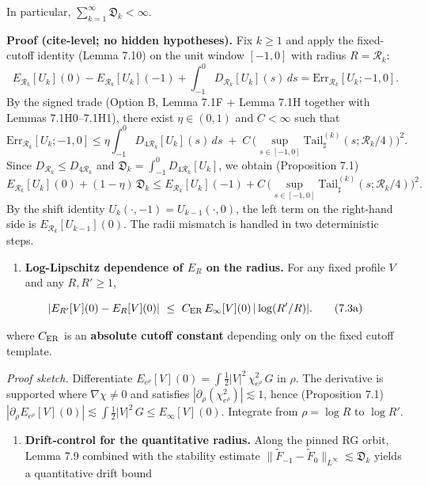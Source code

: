 \documentclass[
  11pt,
]{article}
\providecommand{\tightlist}{%
  \setlength{\itemsep}{0pt}\setlength{\parskip}{0pt}}
\begin{document}
In particular, \(\sum_{k=1}^{\infty}\mathfrak D_k<\infty\).

\textbf{Proof (cite-level; no hidden hypotheses).} Fix \(k\ge1\) and apply the fixed-cutoff identity (Lemma 7.10) on the unit window \([-1,0]\) with radius \(R=\mathcal R_k\): \[
E_{\mathcal R_k}[U_k](0)-E_{\mathcal R_k}[U_k](-1)+\int_{-1}^{0}D_{\mathcal R_k}[U_k](s)\,ds
=\mathrm{Err}_{\mathcal R_k}[U_k;-1,0].
\] By the signed trade (Option B, Lemma 7.1F + Lemma 7.1H together with Lemmas 7.1H0--7.1H1), there exist \(\eta\in(0,1)\) and \(C<\infty\) such that \[
\mathrm{Err}_{\mathcal R_k}[U_k;-1,0]
\le \eta\int_{-1}^{0}D_{4\mathcal R_k}[U_k](s)\,ds
\; +\; C\,\Big(\sup_{s\in[-1,0]}\mathrm{Tail}_\sharp^{(k)}(s;\mathcal R_k/4)\Big)^2.
\] Since \(D_{\mathcal R_k}\le D_{4\mathcal R_k}\) and \(\mathfrak D_k=\int_{-1}^{0}D_{4\mathcal R_k}[U_k]\), we obtain (Proposition 7.1) \[
E_{\mathcal R_k}[U_k](0) + (1-\eta)\,\mathfrak D_k
\le E_{\mathcal R_k}[U_k](-1) + C\,\Big(\sup_{s\in[-1,0]}\mathrm{Tail}_\sharp^{(k)}(s;\mathcal R_k/4)\Big)^2.
\] By the shift identity \(U_k(\cdot,-1)=U_{k-1}(\cdot,0)\), the left term on the right-hand side is \(E_{\mathcal R_k}[U_{k-1}](0)\). The radii mismatch is handled in two deterministic steps.

\begin{enumerate}
\def\labelenumi{\arabic{enumi}.}
\tightlist
\item
  \textbf{Log-Lipschitz dependence of \(E_R\) on the radius.} For any fixed profile \(V\) and any \(R,R'\ge 1\),
\end{enumerate}

\begin{equation}
 |E_{R'}[V](0)-E_R[V](0)|
 \ \le\
 C_{\rm ER}\,E_\infty[V](0)\,|\log(R'/R)|.
 \tag{7.3a}\label{eq:7_3a_log_lipschitz_ER}
\end{equation}

where \(C_{\rm ER}\) is an \textbf{absolute cutoff constant} depending only on the fixed cutoff template.

\emph{Proof sketch.} Differentiate \(E_{e^\rho}[V](0)=\int \tfrac12|V|^2\,\chi_{e^\rho}^2\,G\) in \(\rho\). The derivative is supported where \(\nabla\chi\neq 0\) and satisfies \(|\partial_\rho(\chi_{e^\rho}^2)|\lesssim 1\), hence (Proposition 7.1) \(|\partial_\rho E_{e^\rho}[V](0)|\lesssim \int \tfrac12|V|^2\,G \le E_\infty[V](0)\). Integrate from \(\rho=\log R\) to \(\log R'\).

\begin{enumerate}
\def\labelenumi{\arabic{enumi}.}
\setcounter{enumi}{1}
\tightlist
\item
  \textbf{Drift-control for the quantitative radius.} Along the pinned RG orbit, Lemma 7.9 combined with the stability estimate \(\|\widetilde F_{-1}-\widetilde F_{0}\|_{L^\infty}\lesssim \mathfrak D_k\) yields a quantitative drift bound
\end{enumerate}
\end{document}
